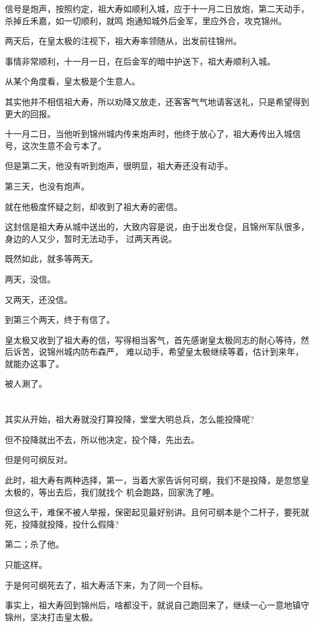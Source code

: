 \documentclass[11pt,a4paper,onecolumn]{article}
\begin{document}
信号是炮声，按照约定，祖大寿如顺利入城，应于十一月二日放炮，第二天动手，杀掉丘禾嘉，如一切顺利，就鸣
炮通知城外后金军，里应外合，攻克锦州。

两天后，在皇太极的注视下，祖大寿率领随从，出发前往锦州。

事情非常顺利，十一月一日，在后金军的暗中护送下，祖大寿顺利入城。

从某个角度看，皇太极是个生意人。

其实他并不相信祖大寿，所以劝降又放走，还客客气气地请客送礼，只是希望得到更大的回报。

十一月二日，当他听到锦州城内传来炮声时，他终于放心了，祖大寿传出入城信号，这次生意不会亏本了。

但是第二天，他没有听到炮声，很明显，祖大寿还没有动手。

第三天，也没有炮声。

就在他极度怀疑之刻，却收到了祖大寿的密信。

这封信是祖大寿从城中送出的，大致内容是说，由于出发仓促，且锦州军队很多，身边的人又少，暂时无法动手，
过两天再说。

既然如此，就多等两天。

两天，没信。

又两天，还没信。

到第三个两天，终于有信了。

皇太极又收到了祖大寿的信，写得相当客气，首先感谢皇太极同志的耐心等待，然后诉苦，说锦州城内防布森严，
难以动手，希望皇太极继续等着，估计到来年，就能办这事了。

被人涮了。

\section[\thesection]{}

其实从开始，祖大寿就没打算投降，堂堂大明总兵，怎么能投降呢?

但不投降就出不去，所以他决定，投个降，先出去。

但是何可纲反对。

此时，祖大寿有两种选择，第一，当着大家告诉何可纲，我们不是投降，是忽悠皇太极的，等出去后，我们就找个
机会跑路，回家洗了睡。

但这么干，难保不被人举报，保密起见最好别讲。且何可纲本是个二杆子，要死就死，投降就投降，投什么假降?

第二；杀了他。

只能这样。

于是何可纲死去了，祖大寿活下来，为了同一个目标。

事实上，祖大寿回到锦州后，啥都没干，就说自己跑回来了，继续一心一意地镇守锦州，坚决打击皇太极。
\end{document}
